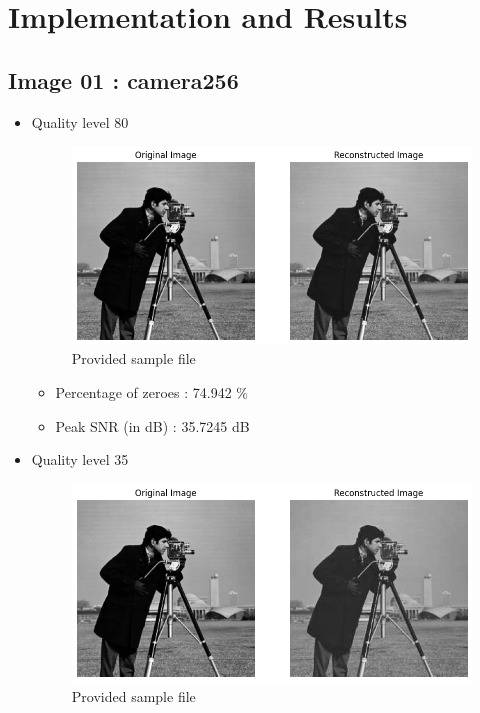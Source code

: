 \documentclass[11pt,a4paper]{article}
\begin{document}
\section{Implementation and Results}

\subsection{Image 01 : camera256} 


\begin{itemize}
    \item Quality level 80
    {\begin{figure}[h]
        \centering
        \includegraphics[width=1.0\linewidth]{images/im1q1.png}
        \caption{Provided sample file}
    \end{figure}}

    \begin{itemize}
        \item Percentage of zeroes : 74.942 \%
        \item Peak SNR (in dB)     : 35.7245 dB
    \end{itemize}



    \item Quality level 35
    {\begin{figure}[h]
        \centering
        \includegraphics[width=1.0\linewidth]{images/im1q2.png}
        \caption{Provided sample file}
    \end{figure}}


\end{itemize}
\end{document}
